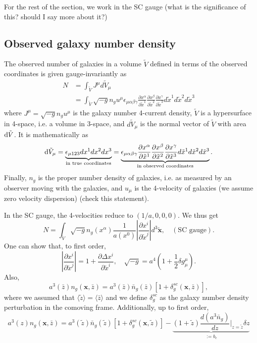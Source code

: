 \documentclass[11pt]{article}
\DeclareRobustCommand{\d}{\ifmmode\text{d}\else d\fi}
\newcommand{\br}[1]{\ensuremath{\left( #1 \right)}}
\begin{document}
For the rest of the section, we work in the SC gauge (what is the significance of this? should I say more about it?)

\subsection{Observed galaxy number density}
The observed number of galaxies in a volume $\tilde V$ defined in terms of the observed coordinates is given gauge-invariantly as
\begin{align}
    N &= \int_{\tilde V} J^\mu d\tilde V_\mu\\
    &= \int_{\tilde V} \sqrt{-g} n_g u^\mu \epsilon_{\mu\alpha\beta\gamma} \frac{\partial x^\alpha}{\partial \tilde x^1}\frac{\partial x^\beta}{\partial \tilde x^2}\frac{\partial x^\gamma}{\partial \tilde x^3} d\tilde x^1 d\tilde x^2 d\tilde x^3
\end{align}
where $J^\mu = \sqrt{-g} n_g u^\mu$ is the galaxy number 4-current density, $\tilde V$ is a hypersurface in 4-space, i.e. a volume in 3-space, and $d\tilde V_\mu$ is the normal vector of $\tilde V$ with area $\d \tilde V$. It is mathematically as
\begin{equation}
    \d \tilde V_\mu = \underbrace{\epsilon_{\mu 123} dx^1dx^2dx^3}_{\text{in true coordinates}} = \underbrace{\epsilon_{\mu \alpha\beta\gamma} \frac{\partial x^\alpha}{\partial \tilde x^1}\frac{\partial x^\beta}{\partial \tilde x^2}\frac{\partial x^\gamma}{\partial \tilde x^3} d\tilde x^1 d\tilde x^2 d\tilde x^3}_{\text{in observed coordinates}}.
\end{equation} 
Finally, $n_g$ is the proper number density of galaxies, i.e. as measured by an observer moving with the galaxies, and $u_\mu$ is the 4-velocity of galaxies (we assume zero velocity dispersion) (check this statement).

In the SC gauge, the 4-velocities reduce to $(1/a, 0, 0, 0)$. We thus get
\begin{equation}
    N = \int_{\tilde V}\sqrt{-g}n_g(x^\alpha)\frac{1}{a(x^0)}\left |\frac{\partial x^i}{\partial \tilde x^j}\right | d^3\tilde {\mathbf x}, \quad (\text{SC gauge}).
    \label{eq:scgaugenumberdensityintruecoords}
\end{equation}
One can show that, to first order,
\begin{equation}
    \left | \frac{\partial x^i}{\partial \tilde x^j} \right | = 1 + \frac{\partial \Delta x^i}{\partial \tilde x^i}, \quad \sqrt{-g} = a^4\br{1 + \frac{1}{2}\delta g^\mu_\mu}.
\end{equation}
Also,
\begin{equation}
    a^3(\bar z) n_g(\mathbf x, \bar z) = a^3(\bar z)\bar n_g(\bar z)[1+\delta_g^{sc}(\mathbf x, \bar z)],
\end{equation}
where we assumed that $\langle \tilde z \rangle = \langle \bar z \rangle$ and we define $\delta_g^{sc}$ as the galaxy number density perturbation in the comoving frame.
Additionally, up to first order,
\begin{equation}
    a^3(z)n_g(\mathbf x, \bar z) = a^3(\tilde z)\bar n_g(\tilde z)[1+\delta_g^{sc}(\mathbf x, \tilde z)] - \underbrace{(1+\tilde z)\frac{d(a^3\bar n_g)}{d z}\Big |_{z=\tilde z}\delta z}_{:=b_c}
\end{equation}
\end{document}
